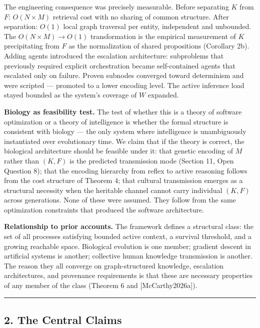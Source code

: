 \documentclass[
]{article}
\begin{document}
The engineering consequence was precisely measurable. Before separating
\(K\) from \(F\): \(O(N \times M)\) retrieval cost with no sharing of
common structure. After separation: \(O(1)\) local graph traversal per
entity, independent and unbounded. The \(O(N \times M) \to O(1)\)
transformation is the empirical measurement of \(K\) precipitating from
\(F\) as the normalization of shared propositions (Corollary 2b). Adding
agents introduced the escalation architecture: subproblems that
previously required explicit orchestration became self-contained agents
that escalated only on failure. Proven subnodes converged toward
determinism and were scripted --- promoted to a lower encoding level.
The active inference load stayed bounded as the system's coverage of
\(W\) expanded.

\textbf{Biology as feasibility test.} The test of whether this is a
theory of software optimization or a theory of intelligence is whether
the formal structure is consistent with biology --- the only system
where intelligence is unambiguously instantiated over evolutionary time.
We claim that if the theory is correct, the biological architecture
should be feasible under it: that genetic encoding of \(M\) rather than
\((K, F)\) is the predicted transmission mode (Section 11, Open Question
8); that the encoding hierarchy from reflex to active reasoning follows
from the cost structure of Theorem 4; that cultural transmission
emerges as a structural necessity when the heritable channel cannot
carry individual \((K, F)\) across generations. None of these were
assumed. They follow from the same optimization constraints that
produced the software architecture.

\textbf{Relationship to prior accounts.} The framework defines a
structural class: the set of all processes satisfying bounded active
context, a survival threshold, and a growing reachable space. Biological
evolution is one member; gradient descent in artificial systems is
another; collective human knowledge transmission is another. The reason
they all converge on graph-structured knowledge, escalation
architectures, and provenance requirements is that these are necessary
properties of any member of the class (Theorem 6 and
{[}McCarthy2026a{]}).

\begin{center}\rule{0.5\linewidth}{0.5pt}\end{center}

\subsection{2. The Central Claims}\label{the-central-claims}
\end{document}

